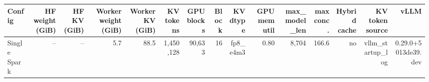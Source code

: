 \begin{tabular}{l r r r r r r r r r r r r r r }
\toprule
Config & HF weight (GiB) & HF KV (GiB) & Worker weight (GiB) & Worker KV (GiB) & KV tokens & GPU blocks & Block & KV dtype & GPU mem util & max\_model\_len & max conc. & Hybrid cache & KV token source & vLLM \\
\midrule
Single Spark & -- & -- & 5.7 & 88.5 & 1,450,128 & 90,633 & 16 & fp8\_e4m3 & 0.80 & 8,704 & 166.6 & no & vllm\_startup\_log & 0.29.0+5013de39.dev \\
\bottomrule
\end{tabular}
